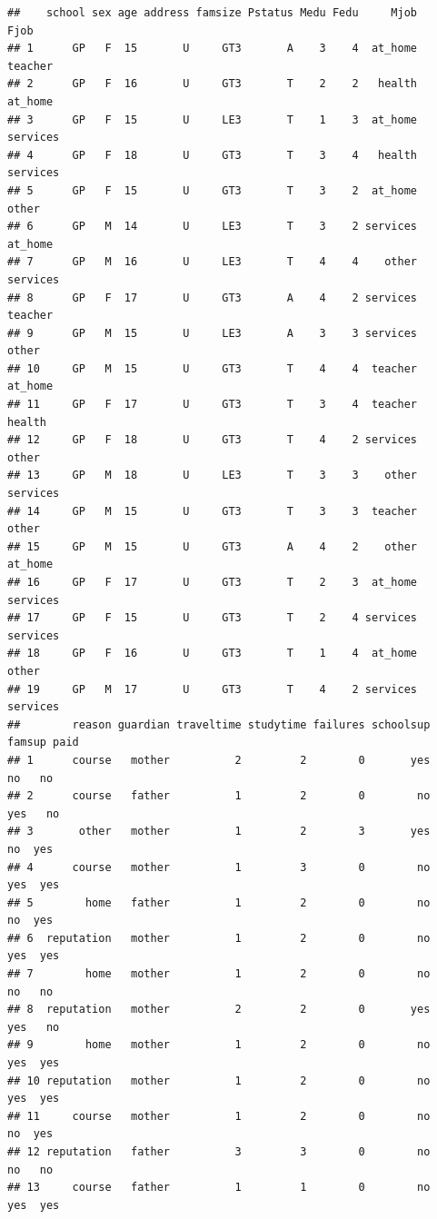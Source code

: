 \documentclass[
]{article}
\begin{document}
\begin{verbatim}
##    school sex age address famsize Pstatus Medu Fedu     Mjob     Fjob
## 1      GP   F  15       U     GT3       A    3    4  at_home  teacher
## 2      GP   F  16       U     GT3       T    2    2   health  at_home
## 3      GP   F  15       U     LE3       T    1    3  at_home services
## 4      GP   F  18       U     GT3       T    3    4   health services
## 5      GP   F  15       U     GT3       T    3    2  at_home    other
## 6      GP   M  14       U     LE3       T    3    2 services  at_home
## 7      GP   M  16       U     LE3       T    4    4    other services
## 8      GP   F  17       U     GT3       A    4    2 services  teacher
## 9      GP   M  15       U     LE3       A    3    3 services    other
## 10     GP   M  15       U     GT3       T    4    4  teacher  at_home
## 11     GP   F  17       U     GT3       T    3    4  teacher   health
## 12     GP   F  18       U     GT3       T    4    2 services    other
## 13     GP   M  18       U     LE3       T    3    3    other services
## 14     GP   M  15       U     GT3       T    3    3  teacher    other
## 15     GP   M  15       U     GT3       A    4    2    other  at_home
## 16     GP   F  17       U     GT3       T    2    3  at_home services
## 17     GP   F  15       U     GT3       T    2    4 services services
## 18     GP   F  16       U     GT3       T    1    4  at_home    other
## 19     GP   M  17       U     GT3       T    4    2 services services
##        reason guardian traveltime studytime failures schoolsup famsup paid
## 1      course   mother          2         2        0       yes     no   no
## 2      course   father          1         2        0        no    yes   no
## 3       other   mother          1         2        3       yes     no  yes
## 4      course   mother          1         3        0        no    yes  yes
## 5        home   father          1         2        0        no     no  yes
## 6  reputation   mother          1         2        0        no    yes  yes
## 7        home   mother          1         2        0        no     no   no
## 8  reputation   mother          2         2        0       yes    yes   no
## 9        home   mother          1         2        0        no    yes  yes
## 10 reputation   mother          1         2        0        no    yes  yes
## 11     course   mother          1         2        0        no     no  yes
## 12 reputation   father          3         3        0        no     no   no
## 13     course   father          1         1        0        no    yes  yes

\end{verbatim}
\end{document}
